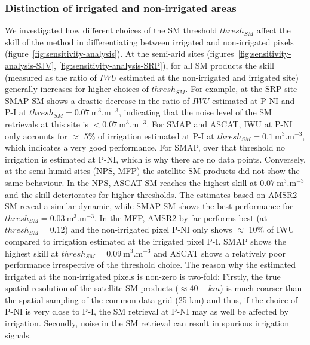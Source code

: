 \documentclass[hess, manuscript]{copernicus}
\begin{document}
\subsubsection{Distinction of irrigated and non-irrigated areas}
\label{ssec:pixel-distinction}
We investigated how different choices of the SM threshold $thresh_{SM}$ affect the skill of the method in differentiating between irrigated and non-irrigated pixels (figure~\ref{fig:sensitivity-analysis}). At the semi-arid sites (figures~\ref{fig:sensitivity-analysis-SJV}, \ref{fig:sensitivity-analysis-SRP}), for all SM products the skill (measured as the ratio of $IWU$ estimated at the non-irrigated and irrigated site) generally increases for higher choices of $thresh_{SM}$. For example, at the SRP site SMAP SM shows a drastic decrease in the ratio of $IWU$ estimated at P-NI and P-I at $thresh_{SM} = 0.07~\si{\m^{3}.\m^{-3}}$, indicating that the noise level of the SM retrievals at this site is $< 0.07~\si{\m^{3}.\m^{-3}}$. For SMAP and ASCAT, IWU at P-NI only accounts for $\approx$ 5\% of irrigation estimated at P-I at $thresh_{SM} = 0.1~\si{\m^{3}.\m^{-3}}$, which indicates a very good performance. For SMAP, over that threshold no irrigation is estimated at P-NI, which is why there are no data points. Conversely, at the semi-humid sites (NPS, MFP) the satellite SM products did not show the same behaviour. In the NPS, ASCAT SM reaches the highest skill at $0.07~\si{\m^{3}.\m^{-3}}$ and the skill deteriorates for higher thresholds. The estimates based on AMSR2 SM reveal a similar dynamic, while SMAP SM shows the best performance for $thresh_{SM} = 0.03~\si{\m^{3}.\m^{-3}}$. In the MFP, AMSR2 by far performs best (at $thresh_{SM} = 0.12$) and the non-irrigated pixel P-NI only shows $\approx$ 10\% of IWU compared to irrigation estimated at the irrigated pixel P-I. SMAP shows the highest skill at $thresh_{SM} = 0.09~\si{\m^{3}.\m^{-3}}$ and ASCAT shows a relatively poor performance irrespective of the threshold choice. The reason why the estimated irrigated at the non-irrigated pixels is non-zero is two-fold: Firstly, the true spatial resolution of the satellite SM products ($\approx 40-km$) is much coarser than the spatial sampling of the common data grid (25-km) and thus, if the choice of P-NI is very close to P-I, the SM retrieval at P-NI may as well be affected by irrigation. Secondly, noise in the SM retrieval can result in spurious irrigation signals.

\end{document}
